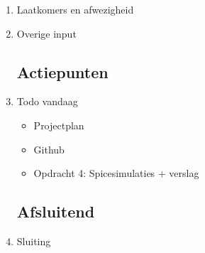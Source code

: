 \documentclass{article}
\begin{document}
\begin{enumerate}
	\item Laatkomers en afwezigheid

	\item Overige input
	\subsection*{Actiepunten}
	\item Todo vandaag
	\begin{itemize}
		\item Projectplan
		\item Github
		\item Opdracht 4: Spicesimulaties + verslag
	\end{itemize}

	\noindent 
	\subsection*{Afsluitend}
	\item Sluiting

\end{enumerate}
\end{document}
